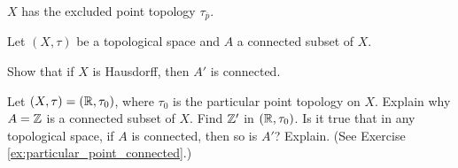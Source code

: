 \item $X$ has the excluded point topology $\tau_{\overline{p}}$. 

\ea

\begin{comment}

\ExerciseSolution

	\ba
	\item Let $C$ be a nonempty subset of $X$. We show that $C$ is connected if and only if $p \in C$. Suppose $p \notin C$. Suppose $C_0$ is a subset of $C$. Then $C_0 \cup \{p\}$ is an open set in $X$ and $C \cap (C_0 \cup \{p\}) = C_0$. So the subspace topology on $C$ is the discrete topology. It follows that $C$ is disconnected. 
	
Now suppose that $p \in C$. To show that $C$ is connected, assume that $U$ and $V$ are open sets with $C \subset (U \cup V)$. Since $U$ and $V$ are open, they both contain $p$. From this it follows that $p \in U \cap V \cap C$. So $U$ and $V$ cannot form a separation of $C$ and $C$ is connected.  
		
	\item Let $C$ be a nonempty subset of $X$. We show that $C$ is connected if and only if $p \in C$. Suppose $p \notin C$. Then every subset of $C$ is an open set and the subspace topology on $C$ is the discrete topology. It follows that $C$ is disconnected.
	
Now suppose that $p \in C$. If $U$ and $V$ are open sets in $X$ with $C \subseteq (U \cup V)$, then $p \in (U \cup V)$. But this implies that $p \in U$ or $p \in V$, which is impossible. So $U$ and $V$ cannot form a separation of $C$ and $C$ is connected.  

	
	\ea	

\end{comment}

\item Let $(X, \tau)$ be a topological space and $A$ a connected subset of $X$.

\ba

\item Show that if $X$ is Hausdorff, then $A'$ is connected.

\item Let $(X, \tau) = (\mathbb{R}, \tau_0)$, where $\tau_0$ is the particular point topology on $X$. Explain why $A = \mathbb{Z}$ is a connected subset of $X$. Find $\mathbb{Z}'$ in $(\mathbb{R}, \tau_0)$. Is it true that in any topological space, if $A$ is connected, then so is $A'$? Explain. (See Exercise \ref{ex:particular_point_connected}.) 

